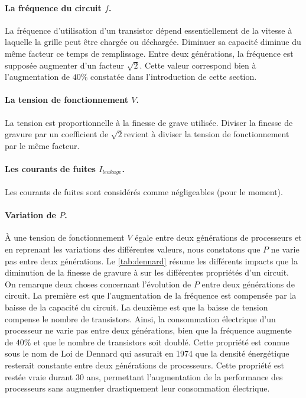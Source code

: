 \paragraph{La fréquence du circuit $f$.} La fréquence d'utilisation d'un transistor dépend essentiellement de la vitesse à laquelle la grille peut être chargée ou déchargée. Diminuer sa capacité diminue du même facteur ce temps de remplissage. Entre deux générations, la fréquence est supposée augmenter d'un facteur $\sqrt{2}$. Cette valeur correspond bien à l'augmentation de $40\%$ constatée dans l'introduction de cette section. 

\paragraph{La tension de fonctionnement $V$.} La tension est proportionnelle à la finesse de grave utilisée. Diviser la finesse de gravure par un coefficient de $\sqrt{2}$revient à diviser la tension de fonctionnement par le même facteur. 

\paragraph{Les courants de fuites $I_{leakage}$.} Les courants de fuites sont considérés comme négligeables (pour le moment). 

\paragraph{Variation de $P$.} À une tension de fonctionnement $V$ égale entre deux générations de processeurs et en reprenant les variations des différentes valeurs, nous constatons que $P$ ne varie pas entre deux générations. Le \autoref{tab:dennard} résume les différents impacts que la diminution de la finesse de gravure à sur les différentes propriétés d'un circuit. On remarque deux choses concernant l'évolution de $P$ entre deux générations de circuit. La première est que l'augmentation de la fréquence est compensée par la baisse de la capacité du circuit. La deuxième est que la baisse de tension compense le nombre de transistors. Ainsi, la consommation électrique d'un processeur ne varie pas entre deux générations, bien que la fréquence augmente de $40\%$ et que le nombre de transistors soit doublé. Cette propriété est connue sous le nom de Loi de Dennard \cite{Dennard1974} qui assurait en 1974 que la densité énergétique resterait constante entre deux générations de processeurs. Cette propriété est restée vraie durant 30 ans, permettant l'augmentation de la performance des processeurs sans augmenter drastiquement leur consommation électrique. 

